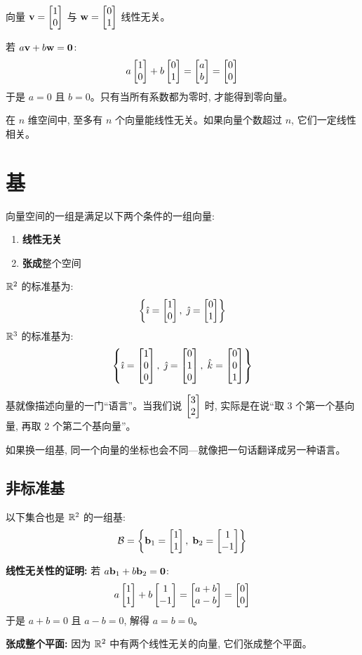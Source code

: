 \begin{example}
向量 $\mathbf{v} = \begin{bmatrix} 1 \\ 0 \end{bmatrix}$ 与 $\mathbf{w} = \begin{bmatrix} 0 \\ 1 \end{bmatrix}$ 线性无关。

若 $a\mathbf{v} + b\mathbf{w} = \mathbf{0}$:
\[
a\begin{bmatrix} 1 \\ 0 \end{bmatrix} + b\begin{bmatrix} 0 \\ 1 \end{bmatrix} = \begin{bmatrix} a \\ b \end{bmatrix} = \begin{bmatrix} 0 \\ 0 \end{bmatrix}
\]
于是 $a = 0$ 且 $b = 0$。只有当所有系数都为零时, 才能得到零向量。
\end{example}

\begin{warning}
在 $n$ 维空间中, 至多有 $n$ 个向量能线性无关。如果向量个数超过 $n$, 它们一定线性相关。
\end{warning}

\section{基}

\begin{definition}[基 (basis)]
向量空间的一组是满足以下两个条件的一组向量:
\begin{enumerate}
    \item \textbf{线性无关}
    \item \textbf{张成}整个空间
\end{enumerate}
\end{definition}

\begin{theorem}
$\mathbb{R}^2$ 的标准基为:
\[
\left\{ \hat{\imath} = \begin{bmatrix} 1 \\ 0 \end{bmatrix}, \; \hat{\jmath} = \begin{bmatrix} 0 \\ 1 \end{bmatrix} \right\}
\]
$\mathbb{R}^3$ 的标准基为:
\[
\left\{ \hat{\imath} = \begin{bmatrix} 1 \\ 0 \\ 0 \end{bmatrix}, \; \hat{\jmath} = \begin{bmatrix} 0 \\ 1 \\ 0 \end{bmatrix}, \; \hat{k} = \begin{bmatrix} 0 \\ 0 \\ 1 \end{bmatrix} \right\}
\]
\end{theorem}

\begin{intuition}
基就像描述向量的一门``语言''。当我们说 $\begin{bmatrix} 3 \\ 2 \end{bmatrix}$ 时, 实际是在说``取 3 个第一个基向量, 再取 2 个第二个基向量''。

如果换一组基, 同一个向量的坐标也会不同---就像把一句话翻译成另一种语言。
\end{intuition}

\subsection{非标准基}

\begin{example}
以下集合也是 $\mathbb{R}^2$ 的一组基:
\[
\mathcal{B} = \left\{ \mathbf{b}_1 = \begin{bmatrix} 1 \\ 1 \end{bmatrix}, \; \mathbf{b}_2 = \begin{bmatrix} 1 \\ -1 \end{bmatrix} \right\}
\]

\textbf{线性无关性的证明:} 若 $a\mathbf{b}_1 + b\mathbf{b}_2 = \mathbf{0}$:
\[
a\begin{bmatrix} 1 \\ 1 \end{bmatrix} + b\begin{bmatrix} 1 \\ -1 \end{bmatrix} = \begin{bmatrix} a+b \\ a-b \end{bmatrix} = \begin{bmatrix} 0 \\ 0 \end{bmatrix}
\]
于是 $a + b = 0$ 且 $a - b = 0$, 解得 $a = b = 0$。

\textbf{张成整个平面:} 因为 $\mathbb{R}^2$ 中有两个线性无关的向量, 它们张成整个平面。
\end{example}

